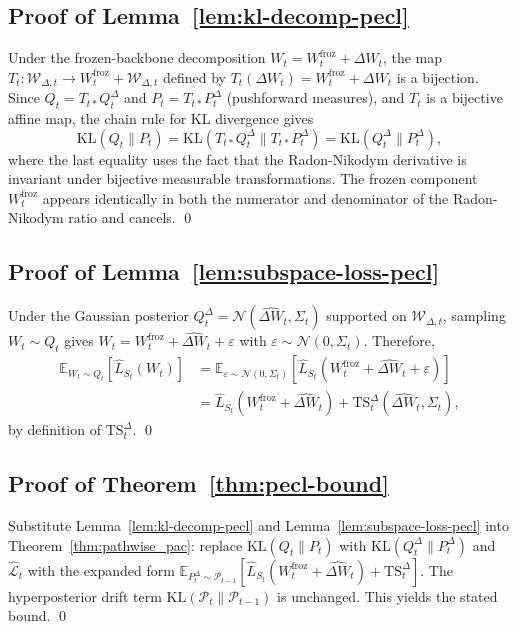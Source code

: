 \subsection{Proof of Lemma~\ref{lem:kl-decomp-pecl}}
\label{proof:Lemma1}

Under the frozen-backbone decomposition $W_t = W_t^{\mathrm{froz}} + \Delta W_t$, the map $T_t : \mathcal{W}_{\Delta,t} \to W_t^{\mathrm{froz}} + \mathcal{W}_{\Delta,t}$ defined by $T_t(\Delta W_t) = W_t^{\mathrm{froz}} + \Delta W_t$ is a bijection.
Since $Q_t = T_{t*} Q_t^\Delta$ and $P_t = T_{t*} P_t^\Delta$ (pushforward measures), and $T_t$ is a bijective affine map, the chain rule for KL divergence gives
\[
\mathrm{KL}(Q_t \| P_t) = \mathrm{KL}(T_{t*} Q_t^\Delta \| T_{t*} P_t^\Delta) = \mathrm{KL}(Q_t^\Delta \| P_t^\Delta),
\]
where the last equality uses the fact that the Radon-Nikodym derivative is invariant under bijective measurable transformations.
The frozen component $W_t^{\mathrm{froz}}$ appears identically in both the numerator and denominator of the Radon-Nikodym ratio and cancels.
\qed

\subsection{Proof of Lemma~\ref{lem:subspace-loss-pecl}}
\label{proof:lemma2}

Under the Gaussian posterior $Q_t^\Delta = \mathcal{N}(\widehat{\Delta W}_t, \Sigma_t)$ supported on $\mathcal{W}_{\Delta,t}$, sampling $W_t \sim Q_t$ gives $W_t = W_t^{\mathrm{froz}} + \widehat{\Delta W}_t + \varepsilon$ with $\varepsilon \sim \mathcal{N}(0, \Sigma_t)$.
Therefore,
\begin{align*}
\mathbb{E}_{W_t \sim Q_t}[\hat{L}_{S_t}(W_t)]
&= \mathbb{E}_{\varepsilon \sim \mathcal{N}(0, \Sigma_t)}[\hat{L}_{S_t}(W_t^{\mathrm{froz}} + \widehat{\Delta W}_t + \varepsilon)] \\
&= \hat{L}_{S_t}(W_t^{\mathrm{froz}} + \widehat{\Delta W}_t) + \mathrm{TS}_t^\Delta(\widehat{\Delta W}_t, \Sigma_t),
\end{align*}
by definition of $\mathrm{TS}_t^\Delta$.
\qed

\subsection{Proof of Theorem~\ref{thm:pecl-bound}}
\label{proof:theorem}

Substitute Lemma~\ref{lem:kl-decomp-pecl} and Lemma~\ref{lem:subspace-loss-pecl} into Theorem~\ref{thm:pathwise_pac}: replace $\mathrm{KL}(Q_t \| P_t)$ with $\mathrm{KL}(Q_t^\Delta \| P_t^\Delta)$ and $\hat{\mathcal{L}}_t$ with the expanded form $\mathbb{E}_{P_t^\Delta \sim \mathcal{P}_{t-1}}[\hat{L}_{S_t}(W_t^{\mathrm{froz}} + \widehat{\Delta W}_t) + \mathrm{TS}_t^\Delta]$.
The hyperposterior drift term $\mathrm{KL}(\mathcal{P}_t \| \mathcal{P}_{t-1})$ is unchanged.
This yields the stated bound.
\qed

